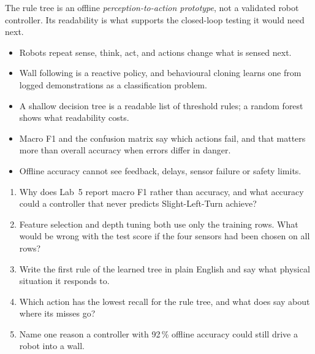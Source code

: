 The rule tree is an offline \emph{perception-to-action prototype}, not a validated robot controller. Its readability is what supports the closed-loop testing it would need next.

\begin{chapterrecap}
\begin{itemize}
  \item Robots repeat sense, think, act, and actions change what is sensed next.
  \item Wall following is a reactive policy, and behavioural cloning learns one from logged demonstrations as a classification problem.
  \item A shallow decision tree is a readable list of threshold rules; a random forest shows what readability costs.
  \item Macro F1 and the confusion matrix say which actions fail, and that matters more than overall accuracy when errors differ in danger.
  \item Offline accuracy cannot see feedback, delays, sensor failure or safety limits.
\end{itemize}
\end{chapterrecap}

\begin{quickcheck}
\begin{enumerate}
  \item Why does Lab~5 report macro F1 rather than accuracy, and what accuracy could a controller that never predicts Slight-Left-Turn achieve?
  \item Feature selection and depth tuning both use only the training rows. What would be wrong with the test score if the four sensors had been chosen on all rows?
  \item Write the first rule of the learned tree in plain English and say what physical situation it responds to.
  \item Which action has the lowest recall for the rule tree, and what does  say about where its misses go?
  \item Name one reason a controller with 92\,\% offline accuracy could still drive a robot into a wall.
\end{enumerate}
\end{quickcheck}
